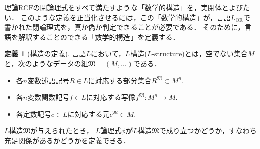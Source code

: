 \documentclass[uplatex, dvipdfmx]{jsarticle}
\newcommand{\M}{\mathfrak{M}}
\newcommand{\RCF}{\mathrm{RCF}}
\newcommand{\map}[3]{{#1}:{#2}\rightarrow{#3}}
\theoremstyle{definition}
\newtheorem{definition}{定義}[section]
\begin{document}
理論$\RCF$の閉論理式をすべて満たすような「数学的構造」を，実閉体とよびたい．
このような定義を正当化させるには，この「数学的構造」が，言語$L_\mathrm{OR}$で書かれた閉論理式を，真か偽か判定できることが必要である．
そのために，言語を解釈することのできる「数学的構造」を定義する．

\begin{definition}[構造の定義]
     言語$L$において，$L$構造($L$-structure)とは，空でない集合$M$と，次のようなデータの組$\M=(M,\dots)$である．
     \begin{itemize}
          \item 各$n$変数述語記号$R \in L$に対応する部分集合$R^\M \subset M^n$.
          \item 各$n$変数関数記号$f \in L$に対応する写像$\map{f^\M}{M^n}{M}$.
          \item 各定数記号$c \in L$に対応する元$c^\M \in M$.
     \end{itemize}
\end{definition}

$L$構造$\M$が与えられたとき，
$L$論理式$\phi$が$L$構造$\M$で成り立つかどうか，すなわち充足関係があるかどうかを定義できる．
\end{document}
